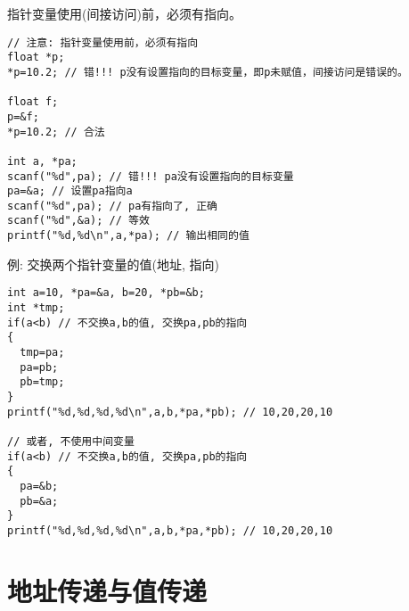 \begin{frame}{指针变量使用(间接访问)前，必须有指向。}
\begin{lstlisting}
// 注意: 指针变量使用前，必须有指向
float *p;
*p=10.2; // 错!!! p没有设置指向的目标变量，即p未赋值，间接访问是错误的。

float f;
p=&f;
*p=10.2; // 合法

int a, *pa;
scanf("%d",pa); // 错!!! pa没有设置指向的目标变量
pa=&a; // 设置pa指向a
scanf("%d",pa); // pa有指向了, 正确
scanf("%d",&a); // 等效
printf("%d,%d\n",a,*pa); // 输出相同的值
\end{lstlisting}
\end{frame}

\begin{frame}{例: 交换两个指针变量的值(地址, 指向)}
\begin{lstlisting}
int a=10, *pa=&a, b=20, *pb=&b;
int *tmp;
if(a<b) // 不交换a,b的值, 交换pa,pb的指向
{
  tmp=pa;
  pa=pb;
  pb=tmp;
}
printf("%d,%d,%d,%d\n",a,b,*pa,*pb); // 10,20,20,10

// 或者, 不使用中间变量
if(a<b) // 不交换a,b的值, 交换pa,pb的指向
{
  pa=&b;
  pb=&a;
}
printf("%d,%d,%d,%d\n",a,b,*pa,*pb); // 10,20,20,10
\end{lstlisting}
\end{frame}

\section{地址传递与值传递}

